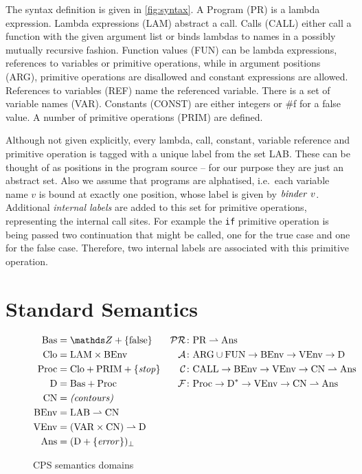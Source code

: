 \documentclass[a4paper,halfparskip,DIV=10,11pt]{scrbook}
\newcommand{\C}{\mathcal C}
\newcommand{\F}{\mathcal F}
\newcommand{\PR}{\mathcal {PR}}
\newcommand{\A}{\mathcal A}
\begin{document}
The syntax definition is given in \vref{fig:syntax}. A Program (PR) is a lambda expression. Lambda expressions (LAM) abstract a call. Calls (CALL) either call a function with the given argument list or binds lambdas to names in a possibly mutually recursive fashion. Function values (FUN) can be lambda expressions, references to variables or primitive operations, while in argument positions (ARG), primitive operations are disallowed and constant expressions are allowed. References to variables (REF) name the referenced variable. There is a set of variable names (VAR). Constants (CONST) are either integers or \#f for a false value. A number of primitive operations (PRIM) are defined.

Although not given explicitly, every lambda, call, constant, variable reference and primitive operation is tagged with a unique label from the set LAB. These can be thought of as positions in the program source – for our purpose they are just an abstract set. Also we assume that programs are alphatised, i.e.\ each variable name $v$ is bound at exactly one position, whose label is given by $\text{\textit{binder}}\ v$. Additional \textit{internal labels} are added to this set for primitive operations, representing the internal call sites. For example the \texttt{if} primitive operation is being passed two continuation that might be called, one for the true case and one for the false case. Therefore, two internal labels are associated with this primitive operation.

\section{Standard Semantics}
\begin{figure}
\setlength{\FrameSep}{0pt}
\begin{framed}
\begin{align*}
\text{Bas} &= \mathds Z + \{\text{false}\} 
						& \PR &\colon \text{PR} \rightharpoonup \text{Ans} \\
\text{Clo} &= \text{LAM} \times \text{BEnv} 
						& \A &\colon \text{ARG}\cup\text{FUN} \to \text{BEnv} \to \text{VEnv} \to \text{D} \\
\text{Proc} &= \text{Clo} + \text{PRIM} + \{\text{\textit{stop}}\} 
						& \C &\colon \text{CALL}\to \text{BEnv} \to \text{VEnv} \to \text{CN} \rightharpoonup \text{Ans} \\
\text{D} &= \text{Bas} + \text{Proc}
						& \F &\colon \text{Proc}\to \text{D}^* \to \text{VEnv} \to \text{CN} \rightharpoonup \text{Ans} \\
\text{CN} &= \text{\textit{(contours)}} \\
\text{BEnv} &= \text{LAB} \rightharpoonup \text{CN} \\
\text{VEnv} &= (\text{VAR}\times\text{CN}) \rightharpoonup \text{D}\\
\text{Ans} &= (\text D + \{\text{\textit{error}}\})_\bot
\end{align*}
\end{framed}
\caption{CPS semantics domains}
\label{fig:semdoms}
\end{figure}
\end{document}
